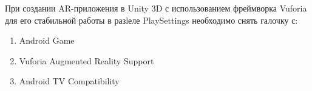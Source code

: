 
При создании AR-приложения в Unity 3D с использованием фреймворка Vuforia для его стабильной работы в разlеле PlaySettings необходимо снять галочку с:

\begin{enumerate}
    \item Android Game
    \item Vuforia Augmented Reality Support
    \item Android TV Compatibility
\end{enumerate}

